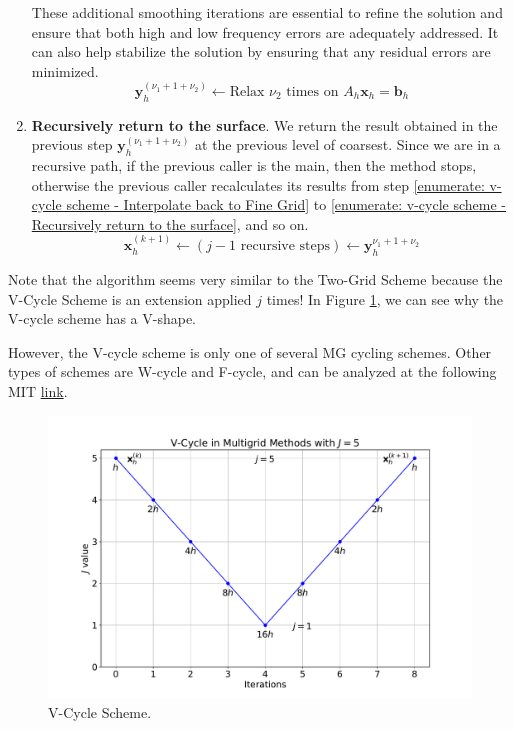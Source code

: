 \begin{enumerate}
    These additional smoothing iterations are essential to refine the solution and ensure that both high and low frequency errors are adequately addressed. It can also help stabilize the solution by ensuring that any residual errors are minimized.
    \begin{equation*}
        \mathbf{y}_{h}^{\left(\nu_{1} + 1 + \nu_{2}\right)} \leftarrow \text{Relax } \nu_{2} \text{ times on } A_{h}\mathbf{x}_{h} = \mathbf{b}_{h}
    \end{equation*}

    \item\label{enumerate: v-cycle scheme - Recursively return to the surface} \textbf{Recursively return to the surface}. We return the result obtained in the previous step $\mathbf{y}_{h}^{\left(\nu_{1} + 1 + \nu_{2}\right)}$ at the previous level of coarsest. Since we are in a recursive path, if the previous caller is the main, then the method stops, otherwise the previous caller recalculates its results from step \ref{enumerate: v-cycle scheme - Interpolate back to Fine Grid} to \ref{enumerate: v-cycle scheme - Recursively return to the surface}, and so on.
    \begin{equation*}
        \mathbf{x}_{h}^{\left(k+1\right)} \leftarrow \left(j-1 \text{ recursive steps}\right) \leftarrow \mathbf{y}_{h}^{\nu_{1} + 1 + \nu_{2}}
    \end{equation*}
\end{enumerate}
Note that the algorithm seems very similar to the Two-Grid Scheme because the V-Cycle Scheme is an extension applied $j$ times! In Figure \ref{fig: V-Cycle Scheme}, we can see why the V-cycle scheme has a V-shape.

\highspace
However, the V-cycle scheme is only one of several MG cycling schemes. Other types of schemes are W-cycle and F-cycle, and can be analyzed at the following MIT \href{https://math.mit.edu/classes/18.086/2006/am63.pdf}{link}.

\newpage

\begin{figure}[!htp]
    \centering
    \includegraphics[width=\textwidth]{img/v-cycle-scheme.pdf}
    \caption{V-Cycle Scheme.}
    \label{fig: V-Cycle Scheme}
\end{figure}

